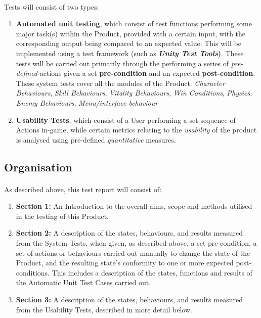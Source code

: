 \documentclass{article}
\begin{document}
\paragraph{}Tests will consist of two types: 
\begin{enumerate}
    \item \textbf{Automated unit testing},  which consist of test functions performing some major task(s) within the Product, provided with a certain input, with the corresponding output being compared to an expected value. This will be  implemented using a test framework (such as \textbf{\emph{Unity Test Tools})}. These tests will be carried out primarily  through the performing a series of \emph{pre-defined} actions given a set \textbf{pre-condition} and an expected \textbf{post-condition}. These system tests cover all the modules of the Product: \emph{Character Behaviours}, \emph{Skill Behaviours}, \emph{Vitality Behaviours}, \emph{Win Conditions}, \emph{Physics}, \emph{Enemy Behaviours}, \emph{Menu/interface behaviour}
    \item \textbf{Usability Tests}, which consist of a User performing a set sequence of Actions in-game, while certain metrics relating to the \emph{usability} of the product is analysed using pre-defined \emph{quantitative} measures.
\end{enumerate}

\subsection{Organisation}
\paragraph{}As described above, this test report will consist of:
\begin{enumerate}
    \item \textbf{Section 1:} An Introduction to the overall aims, scope and methods utilised in the testing of this Product. 
    \item \textbf{Section 2:}  A description of the states, behaviours, and results measured from the System Tests, when given, as described above, a set pre-condition, a set of actions or behaviours carried out manually to change the state of the Product, and the resulting state's conformity to one or more expected post-conditions. This includes a description of the states, functions and results of the Automatic Unit Test Cases carried out.
    \item \textbf{Section 3:} A description of the states, behaviours, and results measured from the Usability Tests, described in more detail below.
\end{enumerate}
\end{document}
